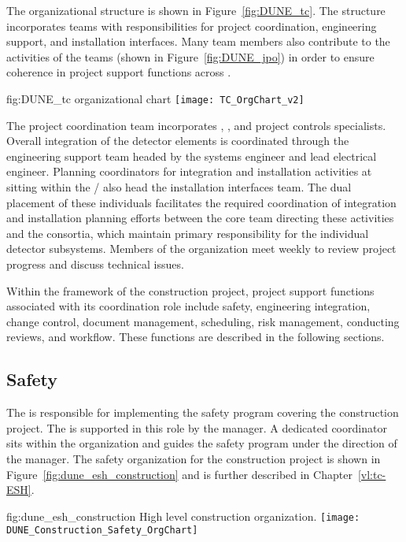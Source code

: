 The   organizational structure is shown 
in Figure~\ref{fig:DUNE_tc}.  The structure incorporates teams 
with responsibilities for project coordination, engineering 
support, and installation interfaces.  Many  team 
members also contribute to the activities of the  
teams (shown in Figure~\ref{fig:DUNE_jpo}) in order to ensure 
coherence in project support functions across .
\begin{dunefigure}{fig:DUNE_tc}
  {  organizational chart}
  \texttt{[image: TC\_OrgChart\_v2]}
\end{dunefigure}
The  project coordination team incorporates , 
, and project controls specialists.  Overall integration 
of the detector elements is coordinated through the  
engineering support team headed by the  systems 
engineer and lead  electrical engineer.  Planning 
coordinators for integration and installation activities at 
 sitting within the /  also head the  installation interfaces team.  
The dual placement of these individuals facilitates the required 
coordination of integration and installation planning efforts between 
the core team directing these activities and the  
consortia, which maintain primary responsibility for the individual 
detector subsystems.  Members of the  organization meet 
weekly to review project progress and discuss technical issues. 
     
Within the framework of the   construction 
project,  project support functions associated with its 
coordination role include safety, engineering integration, change control, document management, scheduling, risk management, conducting reviews, and workflow. These functions are described in the following sections. 

\subsection{Safety}
\label{sec:tc_safety}

The  is responsible for implementing the safety program
covering the  construction project.  The  is
supported in this role by the  
manager.  A dedicated   coordinator sits within
the  organization and guides the  safety program
under the direction of the   manager. The
safety organization for the  construction project is shown
in Figure~\ref{fig:dune_esh_construction} and is further described in
Chapter~\ref{vl:tc-ESH}.
\begin{dunefigure}{fig:dune_esh_construction}
  {High level  construction  organization.}
  \texttt{[image: DUNE\_Construction\_Safety\_OrgChart]}
\end{dunefigure}

